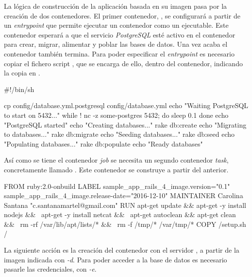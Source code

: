 La lógica de construcción de la aplicación basada en su imagen pasa por la creación de dos contenedores. El primer contenedor, , se configurará a partir de un \textit{entrypoint} que permite ejecutar un contenedor como un ejecutable. Este contenedor esperará a que el servicio \textit{PostgreSQL} esté activo en el contenedor  para crear, migrar, alimentar y poblar las bases de datos. Una vez acaba el contenedor también termina. Para poder especificar el \textit{entrypoint} es necesario copiar el fichero script , que se encarga de ello, dentro del contenedor, indicando la copia en . 

\begin{codelisting}
\label{code:dockerfile}
\begin{code}
#!/bin/sh

cp config/database.yml.postgresql config/database.yml
echo "Waiting PostgreSQL to start on 5432..."
while ! nc -z some-postgres 5432; do
  sleep 0.1
done
echo "PostgreSQL started"
echo "Creating databases..."
rake db:create
echo "Migrating to databases..."
rake db:migrate
echo "Seeding databases..."
rake db:seed
echo "Populating databases..."
rake db:populate
echo "Ready databases"
\end{code}
\end{codelisting}

Así como se tiene el contenedor \textit{job} se necesita un segundo contenedor \textit{task}, concretamente llamado . Este contenedor se construye a partir del anterior.

\begin{codelisting}
\label{code:dockerfile}
\begin{code}
FROM ruby:2.0-onbuild
LABEL sample_app_rails_4_image.version="0.1" 
      sample_app_rails_4_image.release-date="2016-12-10"
MAINTAINER Carolina Santana "c.santanamartel@gmail.com"
RUN apt-get update && apt-get -y install nodejs && \
    apt-get -y install netcat && \
    apt-get autoclean && apt-get clean && \
    rm -rf /var/lib/apt/lists/* && \
    rm -f /tmp/* /var/tmp/*
COPY /setup.sh /
\end{code}
\end{codelisting}

La siguiente acción es la creación del contenedor  con el servidor , a partir de la imagen  indicada con \textit{\--d}. Para poder acceder a la base de datos es necesario pasarle las credenciales, con \textit{\--e}. 

